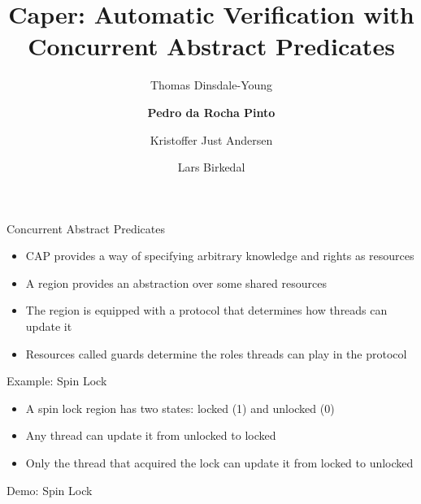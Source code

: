 \documentclass[sans,mathserif,dvipsnames]{beamer}
\begin{document}
\title{Caper: Automatic Verification with Concurrent Abstract Predicates}
\author{Thomas Dinsdale-Young \and \textbf{Pedro da Rocha Pinto} \and Kristoffer Just Andersen \and Lars Birkedal}
\date{}

\begin{frame}
\maketitle
\end{frame}

\begin{frame}{Concurrent Abstract Predicates}
  \begin{itemize}
    \item CAP provides a way of specifying arbitrary knowledge and rights as resources
    \item A region provides an abstraction over some shared resources
    \item The region is equipped with a protocol that determines how threads can update it
    \item Resources called guards determine the roles threads can play in the protocol
  \end{itemize}
\end{frame}

\begin{frame}{Example: Spin Lock}
  \begin{itemize}
    \item A spin lock region has two states: locked (1) and unlocked (0)
    \item Any thread can update it from unlocked to locked
    \item Only the thread that acquired the lock can update it from locked to unlocked
  \end{itemize}
\end{frame}

\begin{frame}{Demo: Spin Lock}
\end{frame}
\end{document}
